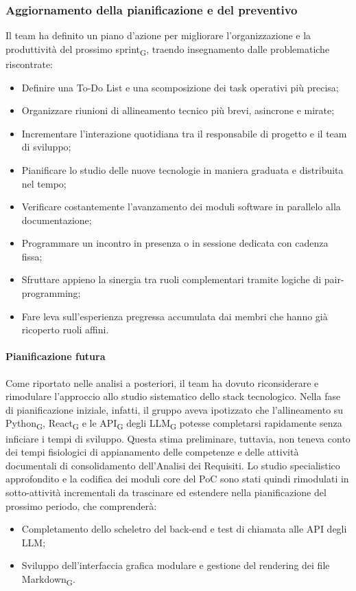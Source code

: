 ﻿\documentclass[a4paper, 10pt, colorlinks=true, linkcolor=black, urlcolor=blue, citecolor=blue, hidelinks]{article}
\begin{document}
\subsubsection{Aggiornamento della pianificazione e del preventivo}
Il team ha definito un piano d'azione per migliorare l'organizzazione e la produttività del prossimo sprint\textsubscript{G}, traendo insegnamento dalle problematiche riscontrate:
\begin{itemize}
    \item Definire una To-Do List e una scomposizione dei task operativi più precisa;
    \item Organizzare riunioni di allineamento tecnico più brevi, asincrone e mirate;
    \item Incrementare l'interazione quotidiana tra il responsabile di progetto e il team di sviluppo;
    \item Pianificare lo studio delle nuove tecnologie in maniera graduata e distribuita nel tempo;
    \item Verificare costantemente l'avanzamento dei moduli software in parallelo alla documentazione;
    \item Programmare un incontro in presenza o in sessione dedicata con cadenza fissa;
    \item Sfruttare appieno la sinergia tra ruoli complementari tramite logiche di pair-programming;
    \item Fare leva sull'esperienza pregressa accumulata dai membri che hanno già ricoperto ruoli affini.
\end{itemize}

\paragraph{Pianificazione futura}
Come riportato nelle analisi a posteriori, il team ha dovuto riconsiderare e rimodulare l'approccio allo studio sistematico dello stack tecnologico. Nella fase di pianificazione iniziale, infatti, il gruppo aveva ipotizzato che l'allineamento su Python\textsubscript{G}, React\textsubscript{G} e le API\textsubscript{G} degli LLM\textsubscript{G} potesse completarsi rapidamente senza inficiare i tempi di sviluppo. Questa stima preliminare, tuttavia, non teneva conto dei tempi fisiologici di appianamento delle competenze e delle attività documentali di consolidamento dell'Analisi dei Requisiti. Lo studio specialistico approfondito e la codifica dei moduli core del PoC sono stati quindi rimodulati in sotto-attività incrementali da trascinare ed estendere nella pianificazione del prossimo periodo, che comprenderà:
\begin{itemize}
    \item Completamento dello scheletro del back-end e test di chiamata alle API degli LLM;
    \item Sviluppo dell'interfaccia grafica modulare e gestione del rendering dei file Markdown\textsubscript{G}.
\end{itemize}
\end{document}
